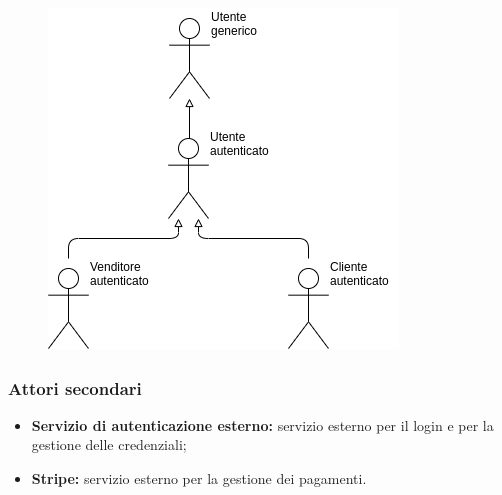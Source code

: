 \begin{itemize}
\begin{itemize}
\begin{figure}[!ht]
                            \includegraphics[scale=0.6]{../../../Images/AnalisiRequisiti/attori}
                            \centering
                        \end{figure}
                \end{itemize}
        \end{itemize}
        \subsubsection{Attori secondari}
        \begin{itemize}
            \item \textbf{Servizio di autenticazione esterno:} servizio esterno per il login e per la gestione delle credenziali;
            \item \textbf{Stripe:} servizio esterno per la gestione dei pagamenti.
        \end{itemize}
        \newpage

